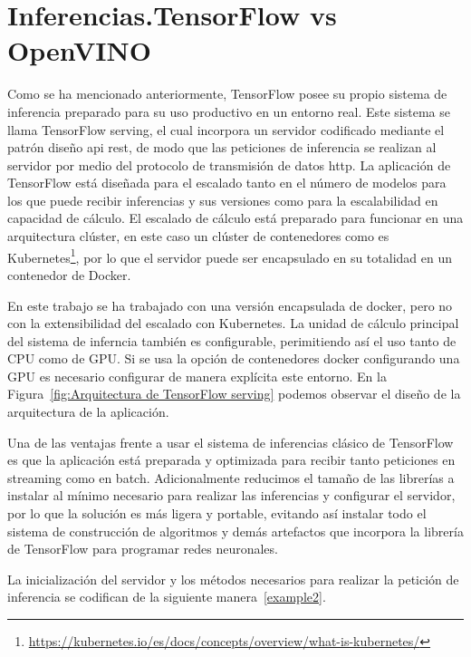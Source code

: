 \section{Inferencias.TensorFlow vs OpenVINO}\label{sec:inferencias.-TensorFlow-vs-OpenVINO}
Como se ha mencionado anteriormente, TensorFlow posee su propio sistema de inferencia preparado para su uso productivo en un entorno real. Este sistema se llama TensorFlow serving, el cual incorpora un servidor codificado mediante el patrón diseño api rest, de modo que las peticiones
de inferencia se realizan al servidor por medio del protocolo de transmisión de datos http.
La aplicación de TensorFlow está diseñada para el escalado tanto en el número de modelos para los que puede recibir inferencias y sus versiones como para la escalabilidad en capacidad de cálculo.
El escalado de cálculo está preparado para funcionar en una arquitectura clúster, en este caso un clúster de contenedores como es Kubernetes\footnote{\url{https://kubernetes.io/es/docs/concepts/overview/what-is-kubernetes/}}, por lo que el servidor puede ser encapsulado en su totalidad en un contenedor de Docker.

En este trabajo se ha trabajado con una versión encapsulada de docker, pero no con la extensibilidad del escalado con Kubernetes.
La unidad de cálculo principal del sistema de inferncia también es configurable, perimitiendo así el uso tanto de CPU como de GPU.
Si se usa la opción de contenedores docker configurando una GPU es necesario configurar de manera explícita este entorno.
En la Figura~\ref{fig:Arquitectura de TensorFlow serving} podemos observar el diseño de la arquitectura de la aplicación.

Una de las ventajas frente a usar el sistema de inferencias clásico de TensorFlow es que la aplicación está preparada y optimizada para recibir tanto peticiones en streaming como en batch.
Adicionalmente reducimos el tamaño de las librerías a instalar al mínimo necesario para realizar las inferencias y configurar el servidor, por lo que la solución es más ligera y portable, evitando así
instalar todo el sistema de construcción de algoritmos y demás artefactos que incorpora la librería de TensorFlow para programar redes neuronales.

La inicialización del servidor y los métodos necesarios para realizar la petición de inferencia se codifican de la siguiente manera~\ref{example2}.

